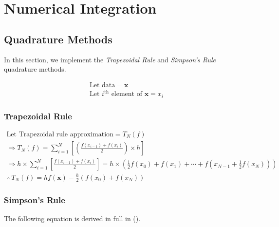 \documentclass[10pt]{article}
\begin{document}
\newpage
\section{Numerical Integration}

    \subsection{Quadrature Methods}
    In this section, we implement the \textit{Trapezoidal Rule} and \textit{Simpson's Rule} quadrature methods.

    \begin{gather*}
        \text{Let data} = \boldsymbol{x} \\
        \text{Let $i^\text{th}$ element of $\boldsymbol{x}$} = x_i
    \end{gather*}

        \subsubsection{Trapezoidal Rule}

        \begin{gather*}
            \text{Let Trapezoidal rule approximation} = T_N(f) \\
            \Rightarrow T_N(f)
            = \sum_{i=1}^{N} \left[ \left( \frac{f(x_{i-1}) + f(x_i)}{2} \right) \times h \right] \\
            \Rightarrow h \times \sum_{i=1}^N \left[ \frac{f(x_{i-1}) + f(x_i)}{2} \right]
            = h \times \left( \frac{1}{2}f(x_0) + f(x_1) + \cdots + f(x_{N-1} + \frac{1}{2}f(x_N))\right) \\
            \therefore \, T_N(f) = hf(\boldsymbol{x}) - \frac{h}{2}(f(x_0) + f(x_N))
        \end{gather*}
        
        

        \pagebreak[4]
        \subsubsection{Simpson's Rule}

        The following equation is derived in full in (\cite{Florescu2019}).
\end{document}
